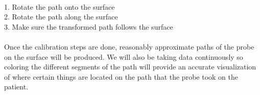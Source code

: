 \\
1. Rotate the path onto the surface\\
2. Rotate the path along the surface\\
3. Make sure the transformed path follows the surface\\
\\
Once the calibration steps are done, reasonably approximate paths of the probe on the surface will be produced. We will also be taking data continuously so coloring the different segments of the path will provide an accurate visualization of where certain things are located on the path that the probe took on the patient.